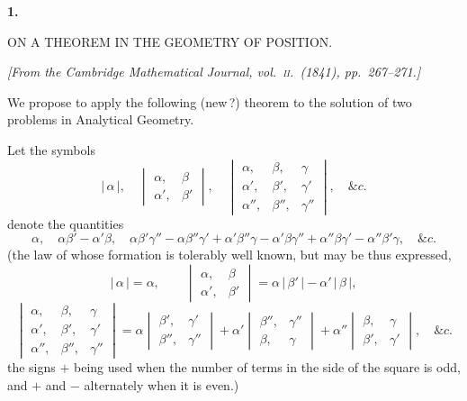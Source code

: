 \documentclass[11pt]{article}
\begin{document}
\begin{center}
{\Large\textbf{1.}}\par
\bigskip
{\Large ON A THEOREM IN THE GEOMETRY OF POSITION.}
\end{center}

\medskip
\begin{center}
\textit{[From the Cambridge Mathematical Journal, vol.\ \textsc{ii}.\ (1841), pp.~267--271.]}
\end{center}

\bigskip

\noindent We propose to apply the following (new\,?) theorem to the solution of two problems in Analytical Geometry.

Let the symbols
\[
|\,\alpha\,|, \quad
\begin{vmatrix} \alpha, & \beta \\ \alpha', & \beta' \end{vmatrix}, \quad
\begin{vmatrix} \alpha, & \beta, & \gamma \\ \alpha', & \beta', & \gamma' \\ \alpha'', & \beta'', & \gamma'' \end{vmatrix}, \quad \&c.
\]
denote the quantities
\[
\alpha,\quad \alpha\beta' - \alpha'\beta,\quad \alpha\beta'\gamma'' - \alpha\beta''\gamma' + \alpha'\beta''\gamma - \alpha'\beta\gamma'' + \alpha''\beta\gamma' - \alpha''\beta'\gamma,\quad \&c.
\]
(the law of whose formation is tolerably well known, but may be thus expressed,
\[
|\,\alpha\,| = \alpha,\qquad
\begin{vmatrix} \alpha, & \beta \\ \alpha', & \beta' \end{vmatrix}
= \alpha\,|\,\beta'\,| - \alpha'\,|\,\beta\,|,
\]
\[
\begin{vmatrix} \alpha, & \beta, & \gamma \\ \alpha', & \beta', & \gamma' \\ \alpha'', & \beta'', & \gamma'' \end{vmatrix}
= \alpha
\begin{vmatrix} \beta', & \gamma' \\ \beta'', & \gamma'' \end{vmatrix}
+ \alpha'
\begin{vmatrix} \beta'', & \gamma'' \\ \beta, & \gamma \end{vmatrix}
+ \alpha''
\begin{vmatrix} \beta, & \gamma \\ \beta', & \gamma' \end{vmatrix}, \quad \&c.
\]
the signs $+$ being used when the number of terms in the side of the square is odd, and $+$ and $-$ alternately when it is even.)
\end{document}

